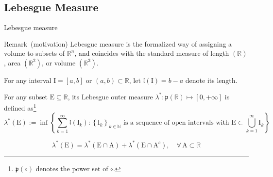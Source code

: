 \documentclass[utf-8, 10pt, aspectratio=1610]{beamer}
\begin{document}
\subsection{Lebesgue Measure}
\begin{frame}[allowframebreaks]{Lebesgue measure}
	\vspace*{\fill}
	\begin{block}{Remark\ (motivation)}
		Lebesgue measure is the formalized way of assigning a volume to subsets of \(\mathbb{R}^n\), and coincides with the standard measure of length \((\mathbb{R})\), area \((\mathbb{R}^2)\), or volume \((\mathbb{R}^3)\).
	\end{block}
	\vspace*{\fill}
	\begin{definition}
		For any interval \(\mathrm{I}=\left[a,b\right]\) or \(\left(a,b\right) \subset \mathbb{R}\), let \(\mathfrak{l}\left(\mathrm{I}\right) = b - a \) denote its length.
	\end{definition}
	\vspace*{\fill}

	\framebreak
	\vspace*{\fill}
	\begin{definition}
		For any subset \(\mathrm{E} \subseteq \mathbb{R}\), its Lebesgue outer measure \(\lambda^{\ast} : \mathfrak{p}\left(\mathbb{R}\right) \mapsto \left[0,+\infty\right]\) is defined as\footnote{\(\mathfrak{p}\left(\circ\right)\) denotes the power set of \(\circ\).}
		\begin{equation}
			\lambda^\ast \left(\mathrm{E}\right) := \operatorname{inf}\left\{\sum_{k=1}^{\infty} \mathfrak{l}\left(\mathrm{I}_k\right): \left\{\mathrm{I}_k\right\}_{k\in \mathbb{N}} \text{ is a sequence of open intervals with } \mathrm{E} \subset \bigcup_{k=1}^{\infty}  \mathrm{I}_k\right\}
		\end{equation}
	\end{definition}
	\vspace*{\fill}
	\begin{definition}
		\begin{equation}
			\lambda^{\ast} \left(\mathrm{E}\right) = \lambda^{\ast} \left(\mathrm{E} \cap \mathrm{A}\right) + \lambda^{\ast} \left(\mathrm{E} \cap \mathrm{A}^c \right),\quad \forall\, \mathrm{A} \subset \mathbb{R}
		\end{equation}
	\end{definition}
	\vspace*{\fill}


\end{frame}
\end{document}
